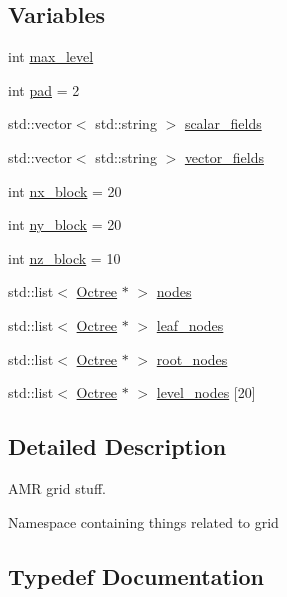 \subsection*{Variables}
\begin{DoxyCompactItemize}
\item 
int \hyperlink{namespacemy_octree_ae2a304436a1b08f28c93d8e54026c8bb}{max\+\_\+level}
\item 
int \hyperlink{namespacemy_octree_afd8ca344b4ea11a79b6154184cdd1eee}{pad} = 2
\item 
std\+::vector$<$ std\+::string $>$ \hyperlink{namespacemy_octree_a4f17c285302d88a975d981d6d3847e0b}{scalar\+\_\+fields}
\item 
std\+::vector$<$ std\+::string $>$ \hyperlink{namespacemy_octree_a2945780283d74e740bfa857e95f7c19a}{vector\+\_\+fields}
\item 
int \hyperlink{namespacemy_octree_a7f30e98430213a41919e16e40abc2078}{nx\+\_\+block} = 20
\item 
int \hyperlink{namespacemy_octree_a39784fe68930da363b3ad335a47bed19}{ny\+\_\+block} = 20
\item 
int \hyperlink{namespacemy_octree_a2b2fa3a7759c3ff5b129847af3e09cc3}{nz\+\_\+block} = 10
\item 
std\+::list$<$ \hyperlink{classmy_octree_1_1_octree}{Octree} $\ast$ $>$ \hyperlink{namespacemy_octree_a8c21e6b5a77ff973d7422aeb09230f2d}{nodes}
\item 
std\+::list$<$ \hyperlink{classmy_octree_1_1_octree}{Octree} $\ast$ $>$ \hyperlink{namespacemy_octree_ab0c724b7056ad36edd2acde8443dae7a}{leaf\+\_\+nodes}
\item 
std\+::list$<$ \hyperlink{classmy_octree_1_1_octree}{Octree} $\ast$ $>$ \hyperlink{namespacemy_octree_a6212186e66a32f5588c044d5ba02dabf}{root\+\_\+nodes}
\item 
std\+::list$<$ \hyperlink{classmy_octree_1_1_octree}{Octree} $\ast$ $>$ \hyperlink{namespacemy_octree_ab896d4170dc937b1579cab36f7aa8015}{level\+\_\+nodes} \mbox{[}20\mbox{]}
\end{DoxyCompactItemize}


\subsection{Detailed Description}
A\+M\+R grid stuff. 

Namespace containing things related to grid 

\subsection{Typedef Documentation}
\hypertarget{namespacemy_octree_a4895f593ecb4b9b86353c728c62fff97}{}
